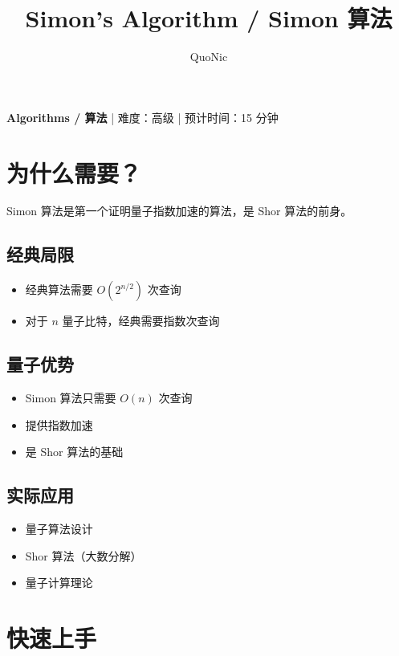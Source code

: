\documentclass[12pt,a4paper]{article}
\title{Simon's Algorithm / Simon 算法}
\author{QuoNic}
\date{}
\begin{document}
\maketitle

\begin{center}
\textbf{Algorithms / 算法} | 难度：高级 | 预计时间：15 分钟
\end{center}

\tableofcontents
\newpage

\section{为什么需要？}

Simon 算法是第一个证明量子指数加速的算法，是 Shor 算法的前身。

\subsection{经典局限}
\begin{itemize}
  \item 经典算法需要 $O(2^{n/2})$ 次查询
  \item 对于 $n$ 量子比特，经典需要指数次查询
\end{itemize}

\subsection{量子优势}
\begin{itemize}
  \item Simon 算法只需要 $O(n)$ 次查询
  \item 提供指数加速
  \item 是 Shor 算法的基础
\end{itemize}

\subsection{实际应用}
\begin{itemize}
  \item 量子算法设计
  \item Shor 算法（大数分解）
  \item 量子计算理论
\end{itemize}

\section{快速上手}
\end{document}
